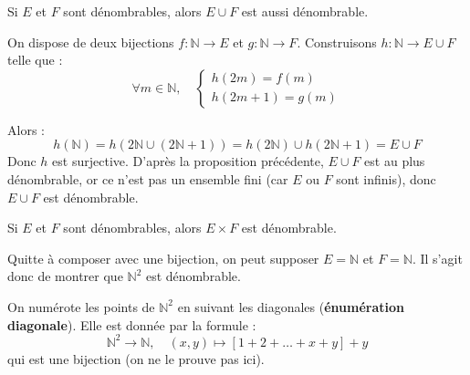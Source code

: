 \documentclass[a4paper,11pt]{article}
\newcommand{\N}{\mathbb{N}}
\newcommand{\mot}[1]{\textcolor{bordeaux}{\textbf{#1}}}
\begin{document}
\begin{corollaire}
Si $E$ et $F$ sont dénombrables, alors $E \cup F$ est aussi dénombrable.
\end{corollaire}

\begin{demonstration}
On dispose de deux bijections $f : \N \to E$ et $g : \N \to F$. Construisons $h : \N \to E \cup F$ telle que :
$$
\forall m \in \N, \quad \begin{cases} h(2m) = f(m) \\ h(2m+1) = g(m) \end{cases}
$$

Alors :
$$ h(\N) = h(2\N \cup (2\N+1)) = h(2\N) \cup h(2\N+1) = E \cup F $$
Donc $h$ est surjective. D'après la proposition précédente, $E \cup F$ est au plus dénombrable, or ce n'est pas un ensemble fini (car $E$ ou $F$ sont infinis), donc $E \cup F$ est dénombrable.
\end{demonstration}

\begin{theoreme}
Si $E$ et $F$ sont dénombrables, alors $E \times F$ est dénombrable.
\end{theoreme}

\begin{demonstration}
Quitte à composer avec une bijection, on peut supposer $E = \N$ et $F = \N$. Il s'agit donc de montrer que $\N^2$ est dénombrable.

\begin{center}
\end{center}

On numérote les points de $\N^2$ en suivant les diagonales (\mot{énumération diagonale}). Elle est donnée par la formule :
$$ \N^2 \to \N, \quad (x,y) \mapsto [1 + 2 + \dots + x + y] + y $$
qui est une bijection (on ne le prouve pas ici).
\end{demonstration}
\end{document}
